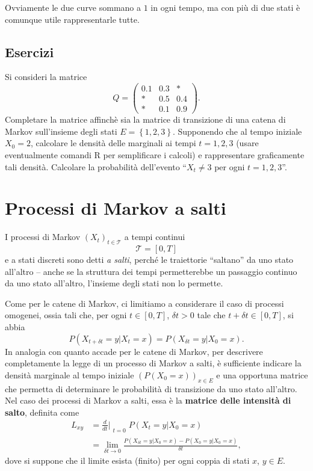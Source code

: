 \documentclass[
  italian,
  letterpaper,
]{book}
\newcommand{\bra}[1]{\left( #1 \right)}
\newcommand{\cur}[1]{\left\{ #1 \right\}}
\theoremstyle{definition}
\theoremstyle{remark}
\begin{document}
Ovviamente le due curve sommano a \(1\) in ogni tempo, ma con più di due
stati è comunque utile rappresentarle tutte.

\subsection{Esercizi}\label{esercizi-34}

Si consideri la matrice \[ Q = \bra{ \begin{array}{lll} 0.1 & 0.3 & * \\
* & 0.5 & 0.4 \\
* & 0.1 & 0.9 
\end{array}}.\] Completare la matrice affinchè sia la matrice di
transizione di una catena di Markov sull'insieme degli stati
\(E = \cur{1,2,3}\). Supponendo che al tempo iniziale \(X_0 = 2\),
calcolare le densità delle marginali ai tempi \(t=1,2,3\) (usare
eventualmente comandi R per semplificare i calcoli) e rappresentare
graficamente tali densità. Calcolare la probabilità dell'evento
``\(X_t \neq 3\) per ogni \(t =1,2,3\)''.

\section{Processi di Markov a salti}\label{sec-markov-salti}

I processi di Markov \((X_t)_{t \in \mathcal{T}}\) a tempi continui
\[\mathcal{T} = [0,T]\] e a stati discreti sono detti \emph{a salti},
perché le traiettorie ``saltano'' da uno stato all'altro -- anche se la
struttura dei tempi permetterebbe un passaggio continuo da uno stato
all'altro, l'insieme degli stati non lo permette.

Come per le catene di Markov, ci limitiamo a considerare il caso di
processi omogenei, ossia tali che, per ogni \(t \in [0,T]\),
\(\delta t>0\) tale che \(t+\delta t \in [0,T]\), si abbia
\[ P(X_{t+\delta t} = y | X_t = x) = P(X_{\delta t} = y| X_0 = x).\] In
analogia con quanto accade per le catene di Markov, per descrivere
completamente la legge di un processo di Markov a salti, è sufficiente
indicare la densità marginale al tempo iniziale
\((P(X_0 = x))_{x\in E}\) e una opportuna matrice che permetta di
determinare le probabilità di transizione da uno stato all'altro. Nel
caso dei processi di Markov a salti, essa è la \textbf{matrice delle
intensità di salto}, definita come
\[ \begin{split} L_{xy} & =\frac{d}{dt}\Bigr|_{\substack{t=0}} P(X_{t} =y| X_0 =x) \\
& =  \lim_{\delta t \to 0}\frac{ P(X_{\delta t} = y | X_0 =x) - P(X_{0} = y | X_0 =x)}{\delta t},\end{split}\]
dove si suppone che il limite esista (finito) per ogni coppia di stati
\(x\), \(y \in E\).
\end{document}
